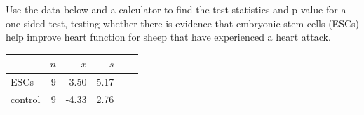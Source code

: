 \begin{exercisewrap}
\begin{nexercise}
Use the data below and a calculator to find the test statistics and p-value for a one-sided test, testing whether there is evidence that embryonic stem cells (ESCs) help improve heart function for sheep that have experienced a heart attack.\footnotemark
\begin{center}
\begin{tabular}{l rrrrr}
\hline
\hspace{10mm}	& $n$	& $\bar{x}$	& $s$  	 \\
\hline
ESCs		& 9		& 3.50		& 5.17  	\\
control		& 9		& -4.33		& 2.76  	 \\
\hline
\end{tabular}
\end{center}
\end{nexercise}
\end{exercisewrap}





\D{\newpage}

